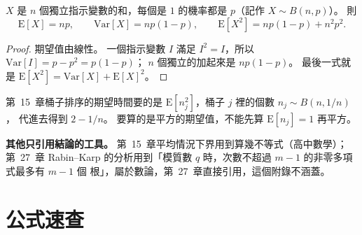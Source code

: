 \begin{theorem}[二項分布]
\label{thm:mth-binomial}
$X$ 是 $n$ 個獨立指示變數的和，每個是 $1$ 的機率都是 $p$（記作 $X \sim B(n, p)$）。 則
\[
\mathrm{E}[X] = np, \qquad \mathrm{Var}[X] = np(1-p), \qquad
\mathrm{E}[X^2] = np(1-p) + n^2p^2 .
\]
\end{theorem}

\begin{proof}
期望值由線性。 一個指示變數 $I$ 滿足 $I^2 = I$，所以 $\mathrm{Var}[I] = p - p^2 = p(1-p)$；
$n$ 個獨立的加起來是 $np(1-p)$。 最後一式就是 $\mathrm{E}[X^2] = \mathrm{Var}[X] +
\mathrm{E}[X]^2$。
\end{proof}

第~15~章桶子排序的期望時間要的是 $\mathrm{E}[n_j^2]$，桶子 $j$ 裡的個數 $n_j \sim B(n, 1/n)$，
代進去得到 $2 - 1/n$。 要算的是平方的期望值，不能先算 $\mathrm{E}[n_j] = 1$ 再平方。

\textbf{其他只引用結論的工具。} 第~15~章平均情況下界用到算幾不等式（高中數學）；第~27~章
Rabin--Karp 的分析用到「模質數 $q$ 時，次數不超過 $m - 1$ 的非零多項式最多有 $m - 1$ 個
根」，屬於數論，第~27~章直接引用，這個附錄不涵蓋。

\section{公式速查}
\label{sec:mth-quickref}

